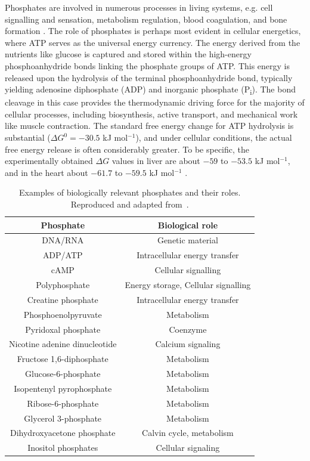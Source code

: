 Phosphates are involved in numerous processes in living systems, e.g. cell signalling and sensation, metabolism regulation, blood coagulation, and bone formation \citep{mullerInorganicPolyphosphatesStorage2019, nebesnayaInorganicPolyphosphateRegulates2024}. The role of phosphates is perhaps most evident in cellular energetics, where ATP serves as the universal energy currency. The energy derived from the nutrients like glucose is captured and stored within the high-energy phosphoanhydride bonds linking the phosphate groups of ATP. This energy is released upon the hydrolysis of the terminal phosphoanhydride bond, typically yielding adenosine diphosphate (ADP) and inorganic phosphate (P\textsubscript{i}). The bond cleavage in this case provides the thermodynamic driving force for the majority of cellular processes, including biosynthesis, active transport, and mechanical work like muscle contraction. The standard free energy change for ATP hydrolysis is substantial ($\Delta G^{0}=-30.5$ kJ mol$^{-1}$), and under cellular conditions, the actual free energy release is often considerably greater. To be specific, the experimentally obtained $\Delta G$ values in liver are about $-59$ to $-53.5$ kJ mol$^{-1}$, and in the heart about $-61.7$ to $-59.5$ kJ mol$^{-1}$ \citep{mullerInorganicPolyphosphatesStorage2019}.

\begin{table}[b!]
    \centering
    \begin{tabular}{cc}
    \toprule
    \textbf{Phosphate} & \textbf{Biological role} \\ 
    \midrule
    DNA/RNA & Genetic material \\
    ADP/ATP & Intracellular energy transfer \\
    cAMP & Cellular signalling \\
    Polyphosphate & Energy storage, Cellular signalling \\
    Creatine phosphate & Intracellular energy transfer \\
    Phosphoenolpyruvate & Metabolism \\
    Pyridoxal phosphate & Coenzyme \\
    Nicotine adenine dinucleotide & Calcium signaling \\
    Fructose 1,6-diphosphate & Metabolism \\
    Glucose-6-phosphate & Metabolism \\
    Isopentenyl pyrophosphate & Metabolism \\
    Ribose-6-phosphate & Metabolism \\
    Glycerol 3-phosphate & Metabolism \\
    Dihydroxyacetone phosphate & Calvin cycle, metabolism \\
    Inositol phosphates & Cellular signaling \\
    \bottomrule
    \end{tabular}
    \caption{Examples of biologically relevant phosphates and their roles. Reproduced and adapted from~\citep{kamerlinWhyNatureReally2013}.}
    \label{tab:role_of_phosphates}
\end{table}


